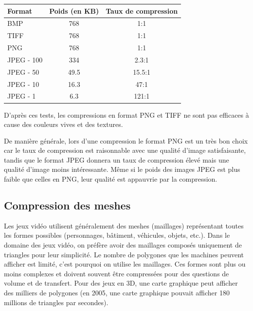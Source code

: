 \documentclass[a4paper, 11pt]{article} %
\begin{document}
\begin{center}
	\begin{tabular}{|l|c|c|}
		\hline
		Format & Poids (en KB)& Taux de compression\\
		\hline
		BMP&768&1:1\\
		TIFF&768&1:1\\
		PNG&768&1:1\\
		JPEG - 100&334&2.3:1\\
		JPEG - 50&49.5&15.5:1\\
		JPEG - 10&16.3&47:1\\
		JPEG - 1&6.3&121:1\\
		\hline
	\end{tabular}
\end{center}

D'après ces tests, les compressions en format PNG et TIFF ne sont pas efficaces à cause des couleurs vives et des textures. 

De manière générale, lors d'une compression le format PNG est un très bon choix car le taux de compression est raisonnable avec une qualité d'image satisfaisante, tandis que le format JPEG donnera un taux de compression élevé mais une qualité d'image moins intéressante. Même si le poids des images JPEG est plus faible que celles en PNG, leur qualité est appauvrie par la compression. 

\subsection*{Compression des meshes}
Les jeux vidéo utilisent généralement des meshes (maillages) représentant toutes les formes possibles (personnages, bâtiment, véhicules, objets, etc.). Dans le domaine des jeux vidéo, on préfère avoir des maillages composés uniquement de triangles pour leur simplicité. Le nombre de polygones que les machines peuvent afficher est limité, c'est pourquoi on utilise les maillages. Ces formes sont plus ou moins complexes et doivent souvent être compressées pour des questions de volume et de transfert. Pour des jeux en 3D, une carte graphique peut afficher des milliers de polygones (en 2005, une carte graphique pouvait afficher 180 millions de triangles par secondes)\cite{compression:meshes}.
\end{document}
